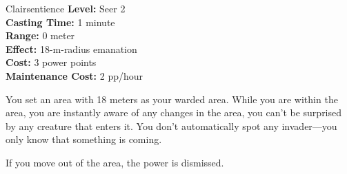 {Clairsentience}
{
	\textbf{Level:}
	Seer 2\\
	\textbf{Casting Time:}
	1 minute\\
	\textbf{Range:}
	0 meter\\
	\textbf{Effect:}
	18-m-radius emanation\\
	\textbf{Cost:}
	3 power points\\
	\textbf{Maintenance Cost:}
	2 pp/hour\\
}
{
	You set an area with 18 meters as your warded area. While you are within the area, you are instantly aware of any changes in the area, you can't be surprised by any creature that enters it. You don't automatically spot any invader---you only know that something is coming.

	If you move out of the area, the power is dismissed.
}